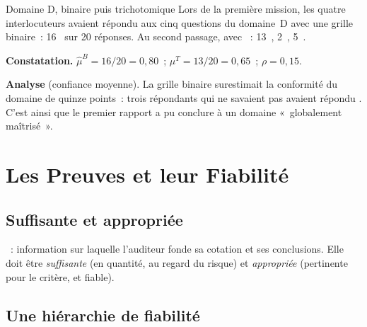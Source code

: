 \begin{boxlecture}{Domaine D, binaire puis trichotomique}
Lors de la première mission, les quatre interlocuteurs avaient répondu aux
cinq questions du domaine~D avec une grille binaire~: 16~\OUI{} sur 20
réponses. Au second passage, avec \NEK{}~: 13~\OUI{}, 2~\NON{}, 5~\NEK{}.

\medskip
\textbf{Constatation.} $\hat{\mu}^{B} = 16/20 = 0{,}80$~; $\mu^{T} = 13/20 =
0{,}65$~; $\rho = 0{,}15$.

\medskip
\textbf{Analyse} (confiance moyenne). La grille binaire surestimait la
conformité du domaine de quinze points~: trois répondants qui ne savaient
pas avaient répondu \OUI{}. C'est ainsi que le premier rapport a pu conclure
à un domaine «~globalement maîtrisé~».

\medskip
\hfill{}
\end{boxlecture}

\section{Les Preuves et leur Fiabilité}
\label{sec:c08-preuves}

\subsection{Suffisante et appropriée}

\begin{boxdef}
~: information sur laquelle
l'auditeur fonde sa cotation et ses conclusions. Elle doit être
\emph{suffisante} (en quantité, au regard du risque) et \emph{appropriée}
(pertinente pour le critère, et fiable).
\end{boxdef}

\subsection{Une hiérarchie de fiabilité}


